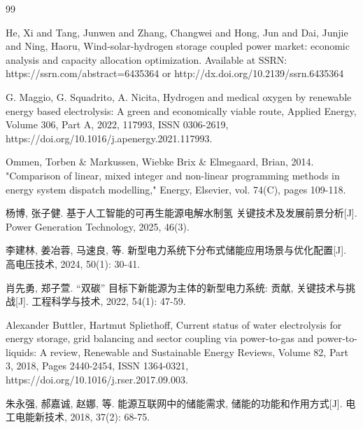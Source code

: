 \documentclass[a4paper]{neepumcm}
\begin{document}
\begin{thebibliography}{99}


 He, Xi and Tang, Junwen and Zhang, Changwei and Hong, Jun and Dai, Junjie and Ning, Haoru, Wind-solar-hydrogen storage coupled power market: economic analysis and capacity allocation optimization. Available at SSRN: https://ssrn.com/abstract=6435364 or http://dx.doi.org/10.2139/ssrn.6435364

 G. Maggio, G. Squadrito, A. Nicita,
Hydrogen and medical oxygen by renewable energy based electrolysis: A green and economically viable route,
Applied Energy,
Volume 306, Part A,
2022,
117993,
ISSN 0306-2619,
https://doi.org/10.1016/j.apenergy.2021.117993.

 Ommen, Torben \& Markussen, Wiebke Brix \& Elmegaard, Brian, 2014. "Comparison of linear, mixed integer and non-linear programming methods in energy system dispatch modelling," Energy, Elsevier, vol. 74(C), pages 109-118.

 杨博, 张子健. 基于人工智能的可再生能源电解水制氢 关键技术及发展前景分析[J]. Power Generation Technology, 2025, 46(3).

 李建林, 姜冶蓉, 马速良, 等. 新型电力系统下分布式储能应用场景与优化配置[J]. 高电压技术, 2024, 50(1): 30-41.


 肖先勇, 郑子萱. “双碳” 目标下新能源为主体的新型电力系统: 贡献, 关键技术与挑战[J]. 工程科学与技术, 2022, 54(1): 47-59.


 Alexander Buttler, Hartmut Spliethoff,
Current status of water electrolysis for energy storage, grid balancing and sector coupling via power-to-gas and power-to-liquids: A review,
Renewable and Sustainable Energy Reviews,
Volume 82, Part 3,
2018,
Pages 2440-2454,
ISSN 1364-0321,
https://doi.org/10.1016/j.rser.2017.09.003.

 朱永强, 郝嘉诚, 赵娜, 等. 能源互联网中的储能需求, 储能的功能和作用方式[J]. 电工电能新技术, 2018, 37(2): 68-75.


\end{thebibliography}

\begin{appendices}

\end{appendices}
\end{document}
